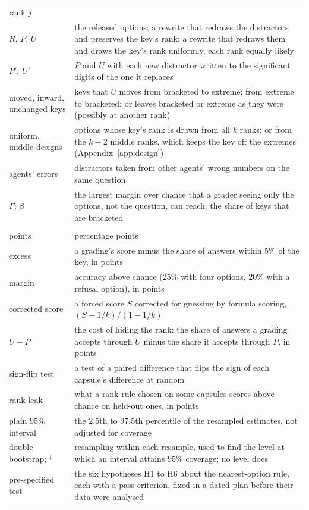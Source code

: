 \documentclass{article}
\begin{document}
\begin{table}[htbp]
\begin{tabularx}{\linewidth}{@{}lX@{}}
rank $j$\\
$R$, $P$, $U$ & the released options; a rewrite that redraws the distractors and preserves the key's rank; a rewrite
that redraws them and draws the key's rank uniformly, each rank equally likely\\
$P'$, $U'$ & $P$ and $U$ with each new distractor written to the significant digits of the one it replaces\\
moved, inward, unchanged keys & keys that $U$ moves from bracketed to extreme; from extreme to bracketed; or leaves
bracketed or extreme as they were (possibly at another rank)\\
uniform, middle designs & options whose key's rank is drawn from all $k$ ranks; or from the $k-2$ middle ranks, which
keeps the key off the extremes (Appendix~\ref{app:design})\\
agents' errors & distractors taken from other agents' wrong numbers on the same question\\
$\Gamma$; $\beta$ & the largest margin over chance that a grader seeing only the options, not the question, can
reach; the share of keys that are bracketed\\
\addlinespace
\multicolumn{2}{@{}l}{\emph{Measures and tests}}\\
points & percentage points\\
excess & a grading's score minus the share of answers within $5\%$ of the key, in points\\
margin & accuracy above chance ($25\%$ with four options, $20\%$ with a refusal option), in points\\
corrected score & a forced score $S$ corrected for guessing by formula scoring, $(S-1/k)/(1-1/k)$
\citep{lordformula,frary}\\
$U-P$ & the cost of hiding the rank: the share of answers a grading accepts through $U$ minus the share it accepts
through $P$, in points\\
sign-flip test & a test of a paired difference that flips the sign of each capsule's difference at random\\
rank leak & what a rank rule chosen on some capsules scores above chance on held-out ones, in points\\
plain $95\%$ interval & the $2.5$th to $97.5$th percentile of the resampled estimates, not adjusted for coverage\\
double bootstrap; $^{\ddagger}$ & resampling within each resample, used to find the level at which an interval
attains $95\%$ coverage; no level does\\
pre-specified test & the six hypotheses H1 to H6 about the nearest-option rule, each with a pass criterion, fixed in
a dated plan before their data were analysed\\
\bottomrule
\end{tabularx}
\end{table}
\end{document}
